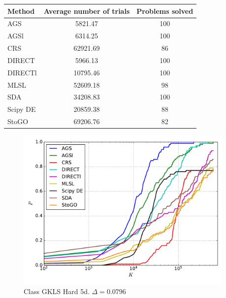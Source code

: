 \documentclass[a4paper]{article}
\begin{document}
\begin{tabular}{lcc}
\hline
 Method   &  Average number of trials  &  Problems solved  \\
\hline
 AGS      &          5821.47           &        100        \\
 AGSl     &          6314.25           &        100        \\
 CRS      &          62921.69          &        86         \\
 DIRECT   &          5966.13           &        100        \\
 DIRECTl  &          10795.46          &        100        \\
 MLSL     &          52609.18          &        98         \\
 SDA      &          34208.83          &        100        \\
 Scipy DE &          20859.38          &        88         \\
 StoGO    &          69206.76          &        82         \\
\hline
\end{tabular}
\begin{figure}[H]
  \center
  \includegraphics[width=0.95\textwidth]{../experiments/gklsh5d_serg/cmc.pdf}
  \caption{Class GKLS Hard 5d. $\Delta=0.0796$}

\end{figure}
\end{document}
